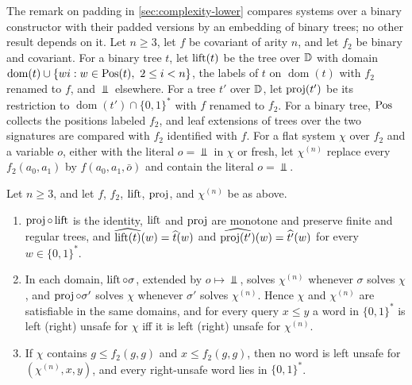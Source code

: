 The remark on padding in \cref{sec:complexity-lower} compares systems over
a binary constructor with their padded versions by an embedding of binary
trees; no other result depends on it. Let
$n\ge3$, let $f$ be covariant of arity $n$, and let $f_2$ be binary and
covariant. For a binary tree $t$, let $\operatorname{lift}(t)$ be the tree over $\mathbb{D}$
with domain $\operatorname{dom}(t)\cup\{wi:w\in\operatorname{Pos}(t),\ 2\le i<n\}$, the
labels of $t$ on $\operatorname{dom}(t)$ with $f_2$ renamed to $f$, and $\Bot$
elsewhere. For a tree $t'$ over $\mathbb{D}$, let $\operatorname{proj}(t')$ be its restriction to
$\operatorname{dom}(t')\cap\{0,1\}^*$ with $f$ renamed to $f_2$. For a binary
tree, $\operatorname{Pos}$ collects the positions labeled $f_2$, and leaf extensions of
trees over the two signatures are compared with $f_2$ identified with $f$.
For a flat system $\chi$ over $f_2$ and a variable $o$, either with the
literal $o=\Bot$ in $\chi$ or fresh, let $\chi^{(n)}$ replace every
$f_2(a_0,a_1)$ by $f(a_0,a_1,\bar o)$ and contain the literal $o=\Bot$.

\begin{proposition}\label{prop:cx-embedding}
Let $n\ge3$, and let $f$, $f_2$, $\operatorname{lift}$, $\operatorname{proj}$, and $\chi^{(n)}$ be as
above.
\begin{enumerate}[leftmargin=*]
\item $\operatorname{proj}\circ\operatorname{lift}$ is the identity, $\operatorname{lift}$ and $\operatorname{proj}$ are
  monotone and preserve finite and regular trees, and
  $\widehat{\operatorname{lift}(t)}(w)=\widehat t(w)$ and
  $\widehat{\operatorname{proj}(t')}(w)=\widehat{t'}(w)$ for every $w\in\{0,1\}^*$.
\item In each domain, $\operatorname{lift}\circ\sigma$, extended by $o\mapsto\Bot$, solves
  $\chi^{(n)}$ whenever $\sigma$ solves $\chi$, and $\operatorname{proj}\circ\sigma'$ solves
  $\chi$ whenever $\sigma'$ solves $\chi^{(n)}$. Hence $\chi$ and $\chi^{(n)}$
  are satisfiable in the same domains, and for every query $x\le y$ a word
  in $\{0,1\}^*$ is left (right) unsafe for $\chi$ iff it is left (right)
  unsafe for $\chi^{(n)}$.
\item If $\chi$ contains $g\le f_2(g,g)$ and $x\le f_2(g,g)$, then no word is
  left unsafe for $(\chi^{(n)},x,y)$, and every right-unsafe word lies in
  $\{0,1\}^*$.
\end{enumerate}
\end{proposition}

